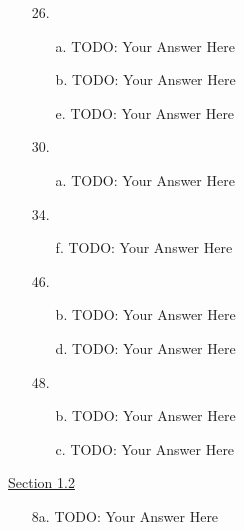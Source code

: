 \documentclass{article}
\begin{document}
\begin{itemize}
  \item[]
  \item[26.] 
    \begin{itemize}
        \item[a.] {\color{red} TODO: Your Answer Here} 
        \item[b.] {\color{red} TODO: Your Answer Here}
        \item[e.] {\color{red} TODO: Your Answer Here}
    \end{itemize}
  \item[]
  \item[30.] 
    \begin{itemize}
        \item[a.] {\color{red} TODO: Your Answer Here} 
    \end{itemize}
  \item[]
  \item[34.] 
    \begin{itemize}
        \item[f.] {\color{red} TODO: Your Answer Here} 
    \end{itemize}
  \item[]
  \item[46.]
    \begin{itemize}
        \item[b.] {\color{red} TODO: Your Answer Here} 
        \item[d.] {\color{red} TODO: Your Answer Here}
    \end{itemize}
  \item[]

  \item[48.]
    \begin{itemize}
        \item[b.] {\color{red} TODO: Your Answer Here} 
        \item[c.] {\color{red} TODO: Your Answer Here}
    \end{itemize}
\end{itemize}

\bigskip
\underline{\Large{Section 1.2}}
\begin{itemize}
  \item[8a.] {\color{red} TODO: Your Answer Here}
  
\end{itemize}
\end{document}
